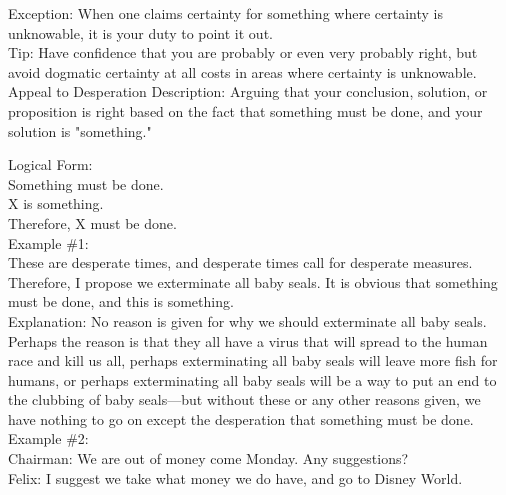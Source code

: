 \documentclass[a4paper,12pt,single,pdftex]{scrartcl}
\begin{document}
    
      Exception: When one claims certainty for something where certainty is unknowable, it is your duty to point it out.
    \\

    
      Tip: Have confidence that you are probably or even very probably right, but avoid dogmatic certainty at all costs in areas where certainty is unknowable.
    \\

  

Appeal to Desperation
    Description: Arguing that your conclusion, solution, or proposition is right based on the fact that something must be done, and your solution is "something."

    
      Logical Form:
    \\

    
      Something must be done.
    \\

    
      X is something.
    \\

    
      Therefore, X must be done.
    \\

    
      Example \#1:
    \\

    
      These are desperate times, and desperate times call for desperate measures.  Therefore, I propose we exterminate all baby seals.  It is obvious that something must be done, and this is something.
    \\

    
      Explanation: No reason is given for why we should exterminate all baby seals.  Perhaps the reason is that they all have a virus that will spread to the human race and kill us all, perhaps exterminating all baby seals will leave more fish for humans, or perhaps exterminating all baby seals will be a way to put an end to the clubbing of baby seals—but without these or any other reasons given, we have nothing to go on except the desperation that something must be done.
    \\

    
      Example \#2:
    \\

    
      Chairman: We are out of money come Monday.  Any suggestions?
    \\

    
      Felix: I suggest we take what money we do have, and go to Disney World.
    \\
\end{document}
